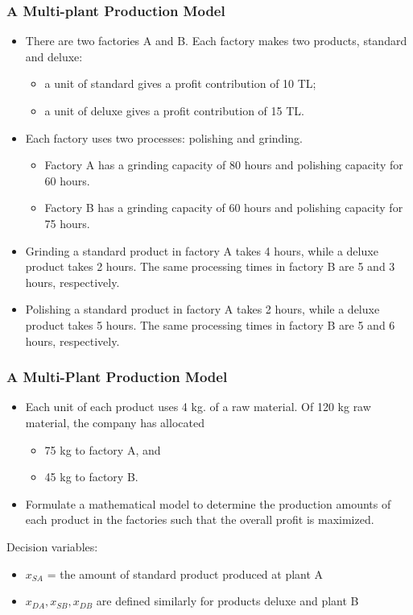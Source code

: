 \documentclass[11pt]{beamer}
\begin{document}
\begin{frame}
\frametitle{A Multi-plant Production Model}
\begin{itemize}
\item There are two factories A and B. Each factory makes two products, standard and deluxe:
\begin{itemize}
\item a unit of standard gives a profit contribution of 10 TL;
\item a unit of deluxe gives a profit contribution of 15 TL.
\end{itemize}
\item Each factory uses two processes: polishing and grinding.
\begin{itemize}
\item Factory A has a grinding capacity of 80 hours and polishing capacity for 60 hours.
\item Factory B has a grinding capacity of 60 hours and polishing capacity for 75 hours.
\end{itemize}
\item Grinding a standard product in factory A takes 4 hours, while a deluxe product takes 2 hours. The same processing times in factory B are 5 and 3 hours, respectively.
\item Polishing a standard product in factory A takes 2 hours, while a deluxe product takes 5 hours. The same processing times in factory B are 5 and 6 hours, respectively.
\end{itemize}

\end{frame}


\begin{frame}
\frametitle{A Multi-Plant Production Model}
\begin{itemize}
\item Each unit of each product uses 4 kg. of a raw material. Of 120 kg raw material, the company has allocated
\begin{itemize}
\item 75 kg to factory A, and
\item 45 kg  to factory B.
\end{itemize}
\item Formulate a mathematical model to determine the production amounts of each product in the factories such that the overall profit is maximized.
\end{itemize}

Decision variables:
\begin{itemize}
\item $x_{SA}$ = the amount of standard product produced at plant A
\item $x_{DA}, x_{SB}, x_{DB}$ are defined similarly for products deluxe and plant B
\end{itemize}
\end{frame}
\end{document}
